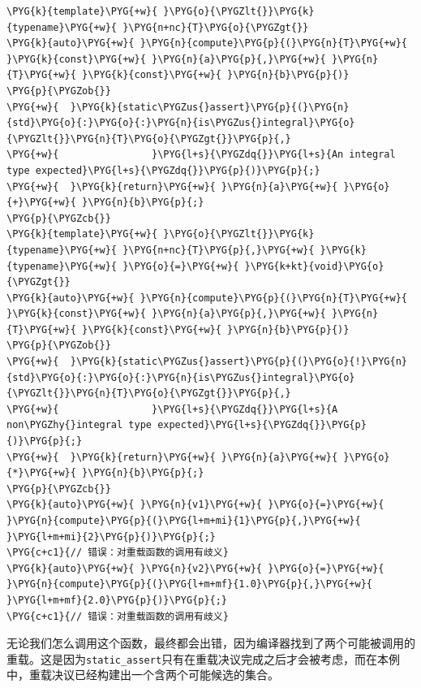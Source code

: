\begin{codeblockbg}
\begin{Verbatim}[commandchars=\\\{\},breaklines=true,breakanywhere=true,fontsize=\codefont,xleftmargin=17bp]
\PYG{k}{template}\PYG{+w}{ }\PYG{o}{\PYGZlt{}}\PYG{k}{typename}\PYG{+w}{ }\PYG{n+nc}{T}\PYG{o}{\PYGZgt{}}
\PYG{k}{auto}\PYG{+w}{ }\PYG{n}{compute}\PYG{p}{(}\PYG{n}{T}\PYG{+w}{ }\PYG{k}{const}\PYG{+w}{ }\PYG{n}{a}\PYG{p}{,}\PYG{+w}{ }\PYG{n}{T}\PYG{+w}{ }\PYG{k}{const}\PYG{+w}{ }\PYG{n}{b}\PYG{p}{)}
\PYG{p}{\PYGZob{}}
\PYG{+w}{  }\PYG{k}{static\PYGZus{}assert}\PYG{p}{(}\PYG{n}{std}\PYG{o}{:}\PYG{o}{:}\PYG{n}{is\PYGZus{}integral}\PYG{o}{\PYGZlt{}}\PYG{n}{T}\PYG{o}{\PYGZgt{}}\PYG{p}{,}
\PYG{+w}{                }\PYG{l+s}{\PYGZdq{}}\PYG{l+s}{An integral type expected}\PYG{l+s}{\PYGZdq{}}\PYG{p}{)}\PYG{p}{;}
\PYG{+w}{  }\PYG{k}{return}\PYG{+w}{ }\PYG{n}{a}\PYG{+w}{ }\PYG{o}{+}\PYG{+w}{ }\PYG{n}{b}\PYG{p}{;}
\PYG{p}{\PYGZcb{}}
\PYG{k}{template}\PYG{+w}{ }\PYG{o}{\PYGZlt{}}\PYG{k}{typename}\PYG{+w}{ }\PYG{n+nc}{T}\PYG{p}{,}\PYG{+w}{ }\PYG{k}{typename}\PYG{+w}{ }\PYG{o}{=}\PYG{+w}{ }\PYG{k+kt}{void}\PYG{o}{\PYGZgt{}}
\PYG{k}{auto}\PYG{+w}{ }\PYG{n}{compute}\PYG{p}{(}\PYG{n}{T}\PYG{+w}{ }\PYG{k}{const}\PYG{+w}{ }\PYG{n}{a}\PYG{p}{,}\PYG{+w}{ }\PYG{n}{T}\PYG{+w}{ }\PYG{k}{const}\PYG{+w}{ }\PYG{n}{b}\PYG{p}{)}
\PYG{p}{\PYGZob{}}
\PYG{+w}{  }\PYG{k}{static\PYGZus{}assert}\PYG{p}{(}\PYG{o}{!}\PYG{n}{std}\PYG{o}{:}\PYG{o}{:}\PYG{n}{is\PYGZus{}integral}\PYG{o}{\PYGZlt{}}\PYG{n}{T}\PYG{o}{\PYGZgt{}}\PYG{p}{,}
\PYG{+w}{                }\PYG{l+s}{\PYGZdq{}}\PYG{l+s}{A non\PYGZhy{}integral type expected}\PYG{l+s}{\PYGZdq{}}\PYG{p}{)}\PYG{p}{;}
\PYG{+w}{  }\PYG{k}{return}\PYG{+w}{ }\PYG{n}{a}\PYG{+w}{ }\PYG{o}{*}\PYG{+w}{ }\PYG{n}{b}\PYG{p}{;}
\PYG{p}{\PYGZcb{}}
\PYG{k}{auto}\PYG{+w}{ }\PYG{n}{v1}\PYG{+w}{ }\PYG{o}{=}\PYG{+w}{ }\PYG{n}{compute}\PYG{p}{(}\PYG{l+m+mi}{1}\PYG{p}{,}\PYG{+w}{ }\PYG{l+m+mi}{2}\PYG{p}{)}\PYG{p}{;}
\PYG{c+c1}{// 错误：对重载函数的调用有歧义}
\PYG{k}{auto}\PYG{+w}{ }\PYG{n}{v2}\PYG{+w}{ }\PYG{o}{=}\PYG{+w}{ }\PYG{n}{compute}\PYG{p}{(}\PYG{l+m+mf}{1.0}\PYG{p}{,}\PYG{+w}{ }\PYG{l+m+mf}{2.0}\PYG{p}{)}\PYG{p}{;}
\PYG{c+c1}{// 错误：对重载函数的调用有歧义}
\end{Verbatim}
\end{codeblockbg}



无论我们怎么调用这个函数，最终都会出错，因为编译器找到了两个可能被调用的重载。这是因为\texttt{static\_\allowbreak{}assert}只有在重载决议完成之后才会被考虑，而在本例中，重载决议已经构建出一个含两个可能候选的集合。


